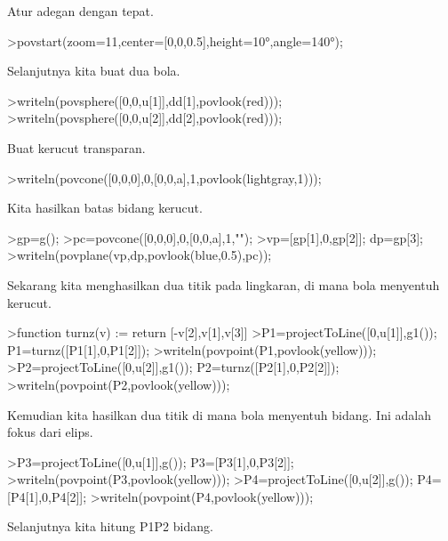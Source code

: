 \documentclass{article}
\begin{document}
\begin{eulernotebook}
\begin{eulercomment}
\begin{eulercomment}
\begin{eulercomment}
\begin{eulercomment}
\begin{eulercomment}
Atur adegan dengan tepat.
\end{eulercomment}
\begin{eulerprompt}
>povstart(zoom=11,center=[0,0,0.5],height=10°,angle=140°);
\end{eulerprompt}
\begin{eulercomment}
Selanjutnya kita buat dua bola.
\end{eulercomment}
\begin{eulerprompt}
>writeln(povsphere([0,0,u[1]],dd[1],povlook(red)));
>writeln(povsphere([0,0,u[2]],dd[2],povlook(red)));
\end{eulerprompt}
\begin{eulercomment}
Buat kerucut transparan.
\end{eulercomment}
\begin{eulerprompt}
>writeln(povcone([0,0,0],0,[0,0,a],1,povlook(lightgray,1)));
\end{eulerprompt}
\begin{eulercomment}
Kita hasilkan batas bidang kerucut.
\end{eulercomment}
\begin{eulerprompt}
>gp=g();
>pc=povcone([0,0,0],0,[0,0,a],1,"");
>vp=[gp[1],0,gp[2]]; dp=gp[3];
>writeln(povplane(vp,dp,povlook(blue,0.5),pc));
\end{eulerprompt}
\begin{eulercomment}
Sekarang kita menghasilkan dua titik pada lingkaran, di mana bola
menyentuh kerucut.
\end{eulercomment}
\begin{eulerprompt}
>function turnz(v) := return [-v[2],v[1],v[3]]
>P1=projectToLine([0,u[1]],g1()); P1=turnz([P1[1],0,P1[2]]);
>writeln(povpoint(P1,povlook(yellow)));
>P2=projectToLine([0,u[2]],g1()); P2=turnz([P2[1],0,P2[2]]);
>writeln(povpoint(P2,povlook(yellow)));
\end{eulerprompt}
\begin{eulercomment}
Kemudian kita hasilkan dua titik di mana bola menyentuh bidang. Ini
adalah fokus dari elips.
\end{eulercomment}
\begin{eulerprompt}
>P3=projectToLine([0,u[1]],g()); P3=[P3[1],0,P3[2]];
>writeln(povpoint(P3,povlook(yellow)));
>P4=projectToLine([0,u[2]],g()); P4=[P4[1],0,P4[2]];
>writeln(povpoint(P4,povlook(yellow)));
\end{eulerprompt}
\begin{eulercomment}
Selanjutnya kita hitung P1P2 bidang.
\end{eulercomment}

\end{eulercomment}
\end{eulercomment}
\end{eulercomment}
\end{eulercomment}
\end{eulernotebook}
\end{document}
